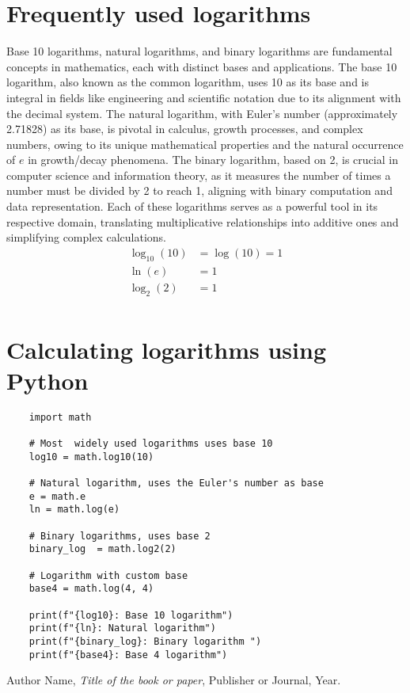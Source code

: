 \documentclass{article}
\begin{document}
\section{Frequently used logarithms}
    Base 10 logarithms, natural logarithms, and binary logarithms are fundamental concepts in mathematics, each with distinct bases and applications. The base 10 logarithm, also known as the common logarithm, uses 10 as its base and is integral in fields like engineering and scientific notation due to its alignment with the decimal system. The natural logarithm, with Euler's number (approximately 2.71828) as its base, is pivotal in calculus, growth processes, and complex numbers, owing to its unique mathematical properties and the natural occurrence of $e$ in growth/decay phenomena. The binary logarithm, based on 2, is crucial in computer science and information theory, as it measures the number of times a number must be divided by 2 to reach 1, aligning with binary computation and data representation. Each of these logarithms serves as a powerful tool in its respective domain, translating multiplicative relationships into additive ones and simplifying complex calculations.
    \begin{align}
        \log_{10}(10) &= \log(10) = 1 \\
        \ln(e) &= 1 \\
        \log_{2}(2) &= 1 \\
    \end{align}
\section{Calculating logarithms using Python}
\begin{lstlisting}
    import math

    # Most  widely used logarithms uses base 10
    log10 = math.log10(10)
    
    # Natural logarithm, uses the Euler's number as base
    e = math.e
    ln = math.log(e)
    
    # Binary logarithms, uses base 2
    binary_log  = math.log2(2)
    
    # Logarithm with custom base
    base4 = math.log(4, 4)
    
    print(f"{log10}: Base 10 logarithm")
    print(f"{ln}: Natural logarithm")
    print(f"{binary_log}: Binary logarithm ")
    print(f"{base4}: Base 4 logarithm")
\end{lstlisting}
    


\begin{thebibliography}{9}
Author Name,
\textit{Title of the book or paper},
Publisher or Journal, Year.

\end{thebibliography}
\end{document}

